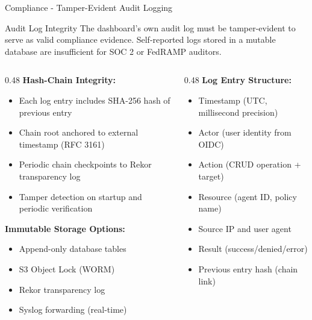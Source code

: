 \begin{frame}{Compliance - Tamper-Evident Audit Logging}
  \begin{block}{Audit Log Integrity}
    \scriptsize
    The dashboard's own audit log must be tamper-evident to serve as
    valid compliance evidence. Self-reported logs stored in a mutable database
    are insufficient for SOC 2 or FedRAMP auditors.
  \end{block}

  \vspace{0.2cm}

  \scriptsize
  \begin{columns}[T]
    \begin{column}{0.48\textwidth}
      \textbf{Hash-Chain Integrity:}
      \begin{itemize}
        \item Each log entry includes SHA-256 hash of previous entry
        \item Chain root anchored to external timestamp (RFC 3161)
        \item Periodic chain checkpoints to Rekor transparency log
        \item Tamper detection on startup and periodic verification
      \end{itemize}

      \vspace{0.15cm}

      \textbf{Immutable Storage Options:}
      \begin{itemize}
        \item Append-only database tables
        \item S3 Object Lock (WORM)
        \item Rekor transparency log
        \item Syslog forwarding (real-time)
      \end{itemize}
    \end{column}
    \begin{column}{0.48\textwidth}
      \textbf{Log Entry Structure:}
      \begin{itemize}
        \item Timestamp (UTC, millisecond precision)
        \item Actor (user identity from OIDC)
        \item Action (CRUD operation + target)
        \item Resource (agent ID, policy name)
        \item Source IP and user agent
        \item Result (success/denied/error)
        \item Previous entry hash (chain link)
      \end{itemize}


\end{column}
\end{columns}
\end{frame}
